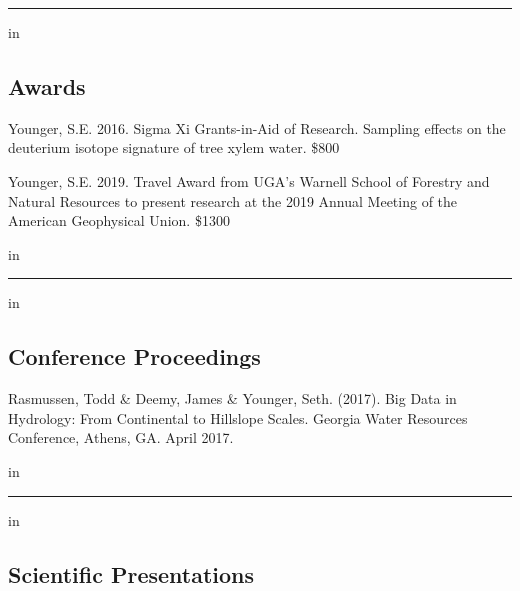 \documentclass[10pt,letterpaper]{article}
\begin{document}
\hrule
\vspace{-0.4em}
 in
\subsection*{Awards}

\begin{hangparas}{.25in}{1}

Younger, S.E. 2016. Sigma Xi Grants-in-Aid of Research. Sampling effects on the deuterium isotope signature of tree xylem water. \$800


Younger, S.E. 2019. Travel Award from UGA's Warnell School of Forestry and Natural Resources to present research at the 2019 Annual Meeting of the American Geophysical Union. \$1300

\vspace{-0.4em}
 in

\end{hangparas}

\hrule
\vspace{-0.4em}
 in
\subsection*{Conference Proceedings}

\begin{hangparas}{.25in}{1}
	
	Rasmussen, Todd \& Deemy, James \& Younger, Seth. (2017). Big Data in Hydrology: From Continental to Hillslope Scales. Georgia Water Resources Conference, Athens, GA. April 2017.

\end{hangparas}

 in

\begingroup
\footnotesize

\hrule
\vspace{-0.4em}
 in

\subsection*{Scientific Presentations}
\end{document}
